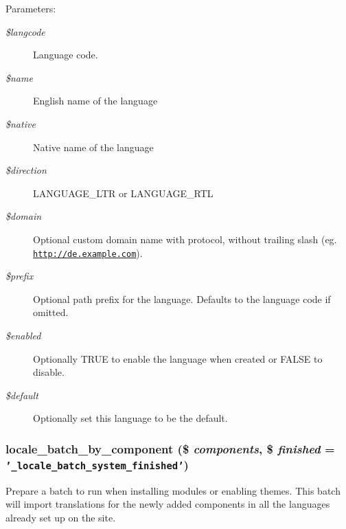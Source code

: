 \begin{Desc}
\item[Parameters:]
\begin{description}
\item[{\em \$langcode}]Language code. \item[{\em \$name}]English name of the language \item[{\em \$native}]Native name of the language \item[{\em \$direction}]LANGUAGE\_\-LTR or LANGUAGE\_\-RTL \item[{\em \$domain}]Optional custom domain name with protocol, without trailing slash (eg. \href{http://de.example.com}{\tt http://de.example.com}). \item[{\em \$prefix}]Optional path prefix for the language. Defaults to the language code if omitted. \item[{\em \$enabled}]Optionally TRUE to enable the language when created or FALSE to disable. \item[{\em \$default}]Optionally set this language to be the default. \end{description}
\end{Desc}
\hypertarget{group__locale_ga6ec98b4c2d6b82b6f206bafcf7d2ce6}{
\subsubsection[{locale\_\-batch\_\-by\_\-component}]{\setlength{\rightskip}{0pt plus 5cm}locale\_\-batch\_\-by\_\-component (\$ {\em components}, \/  \$ {\em finished} = {\tt '\_\-locale\_\-batch\_\-system\_\-finished'})}}
\label{group__locale_ga6ec98b4c2d6b82b6f206bafcf7d2ce6}


Prepare a batch to run when installing modules or enabling themes. This batch will import translations for the newly added components in all the languages already set up on the site.

